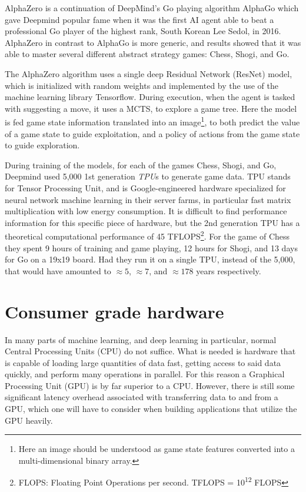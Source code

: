 AlphaZero is a continuation of DeepMind's Go playing algorithm AlphaGo which gave Deepmind popular fame when it was the first AI agent able to beat a professional Go player of the highest rank, South Korean Lee Sedol, in 2016\cite{Silver2017}. AlphaZero in contrast to AlphaGo is more generic, and results showed that it was able to master several different abstract strategy games: Chess, Shogi, and Go\cite{Silver2018}.

The AlphaZero algorithm uses a single deep Residual Network (ResNet) model, which is initialized with random weights and implemented by the use of the machine learning library Tensorflow. During execution, when the agent is tasked with suggesting a move, it uses a MCTS, to explore a game tree. Here the model is fed game state information translated into an image\footnote{Here an image should be understood as game state features converted into a multi-dimensional binary array.}, to both predict the value of a game state to guide exploitation, and a policy of actions from the game state to guide exploration.

During training of the models, for each of the games Chess, Shogi, and Go, Deepmind used 5,000 1st generation \textit{TPU}s to generate game data. TPU stands for Tensor Processing Unit, and is Google-engineered hardware specialized for neural network machine learning in their server farms, in particular fast matrix multiplication with low energy consumption. It is difficult to find performance information for this specific piece of hardware, but the 2nd generation TPU has a theoretical computational performance of 45 TFLOPS\footnote{FLOPS: Floating Point Operations per second. TFLOPS = 10\textsuperscript{12} FLOPS}\cite{Kennedy2017}. For the game of Chess they spent 9 hours of training and game playing, 12 hours for Shogi, and 13 days for Go on a 19x19 board\cite{Silver2018}. Had they run it on a single TPU, instead of the 5,000, that would have amounted to $\approx 5$, $\approx 7$, and $\approx 178$ years respectively.

\section{Consumer grade hardware}
In many parts of machine learning, and deep learning in particular, normal Central Processing Units (CPU) do not suffice. What is needed is hardware that is capable of loading large quantities of data fast, getting access to said data quickly, and perform many operations in parallel. For this reason a Graphical Processing Unit (GPU) is by far superior to a CPU. However, there is still some significant latency overhead associated with transferring data to and from a GPU, which one will have to consider when building applications that utilize the GPU heavily.

